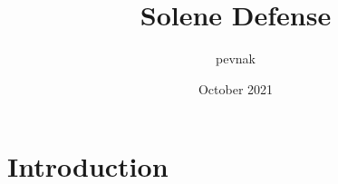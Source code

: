 \documentclass{article}
\title{Solene Defense}
\author{pevnak }
\date{October 2021}
\begin{document}
\maketitle

\section{Introduction}
\end{document}

